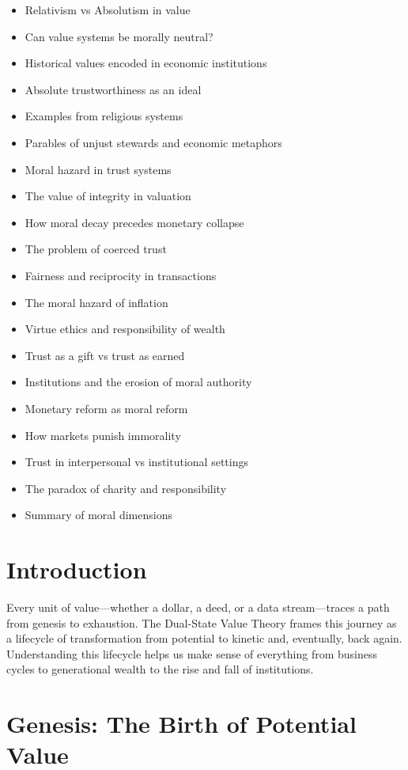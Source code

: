 \documentclass[11pt,oneside]{book}
\begin{document}
\begin{itemize}
\item Relativism vs Absolutism in value
\item Can value systems be morally neutral?
\item Historical values encoded in economic institutions
\item Absolute trustworthiness as an ideal
\item Examples from religious systems
\item Parables of unjust stewards and economic metaphors
\item Moral hazard in trust systems
\item The value of integrity in valuation
\item How moral decay precedes monetary collapse
\item The problem of coerced trust
\item Fairness and reciprocity in transactions
\item The moral hazard of inflation
\item Virtue ethics and responsibility of wealth
\item Trust as a gift vs trust as earned
\item Institutions and the erosion of moral authority
\item Monetary reform as moral reform
\item How markets punish immorality
\item Trust in interpersonal vs institutional settings
\item The paradox of charity and responsibility
\item Summary of moral dimensions
\end{itemize}


\section{Introduction}

Every unit of value—whether a dollar, a deed, or a data stream—traces a path from genesis to exhaustion. The Dual-State Value Theory frames this journey as a lifecycle of transformation from potential to kinetic and, eventually, back again. Understanding this lifecycle helps us make sense of everything from business cycles to generational wealth to the rise and fall of institutions.

\section{Genesis: The Birth of Potential Value}
\end{document}
